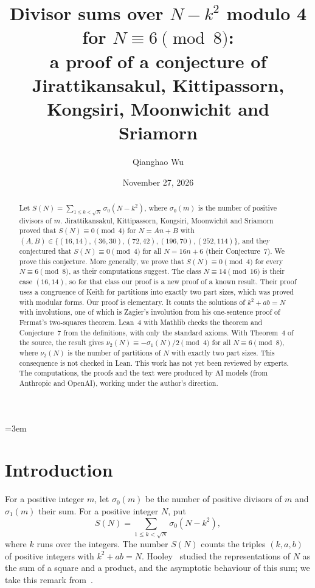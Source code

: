 \documentclass[11pt]{article}
\title{Divisor sums over $N-k^2$ modulo 4 for $N\equiv 6 \pmod 8$:\\ a proof of a conjecture of Jirattikansakul, Kittipassorn,\\ Kongsiri, Moonwichit and Sriamorn}
\author{Qianghao Wu}
\date{November 27, 2026}
\theoremstyle{remark}
\begin{document}
\emergencystretch=3em
\maketitle

\begin{abstract}
Let $S(N)=\sum_{1\le k<\sqrt N}\sigma_0(N-k^2)$, where $\sigma_0(m)$ is the number of positive divisors of $m$. Jirattikansakul, Kittipassorn, Kongsiri, Moonwichit and Sriamorn proved that $S(N)\equiv 0 \pmod 4$ for $N=An+B$ with $(A,B)\in\{(16,14),(36,30),(72,42),(196,70),(252,114)\}$, and they conjectured that $S(N)\equiv 0\pmod 4$ for all $N=16n+6$ (their Conjecture~7). We prove this conjecture. More generally, we prove that $S(N)\equiv 0\pmod 4$ for every $N\equiv 6\pmod 8$, as their computations suggest. The class $N\equiv 14\pmod{16}$ is their case $(16,14)$, so for that class our proof is a new proof of a known result. Their proof uses a congruence of Keith for partitions into exactly two part sizes, which was proved with modular forms. Our proof is elementary. It counts the solutions of $k^2+ab=N$ with involutions, one of which is Zagier's involution from his one-sentence proof of Fermat's two-squares theorem. Lean~4 with Mathlib checks the theorem and Conjecture~7 from the definitions, with only the standard axioms. With Theorem~4 of the source, the result gives $\nu_2(N)\equiv-\sigma_1(N)/2\pmod 4$ for all $N\equiv 6\pmod 8$, where $\nu_2(N)$ is the number of partitions of $N$ with exactly two part sizes. This consequence is not checked in Lean. This work has not yet been reviewed by experts. The computations, the proofs and the text were produced by AI models (from Anthropic and OpenAI), working under the author's direction.
\end{abstract}

\section{Introduction}

For a positive integer $m$, let $\sigma_0(m)$ be the number of positive divisors of $m$ and $\sigma_1(m)$ their sum. For a positive integer $N$, put
\[
S(N)=\sum_{1\le k<\sqrt N}\sigma_0(N-k^2),
\]
where $k$ runs over the integers. The number $S(N)$ counts the triples $(k,a,b)$ of positive integers with $k^2+ab=N$. Hooley~\cite{Hooley} studied the representations of $N$ as the sum of a square and a product, and the asymptotic behaviour of this sum; we take this remark from~\cite[Section~1]{JKKMS}.
\end{document}
